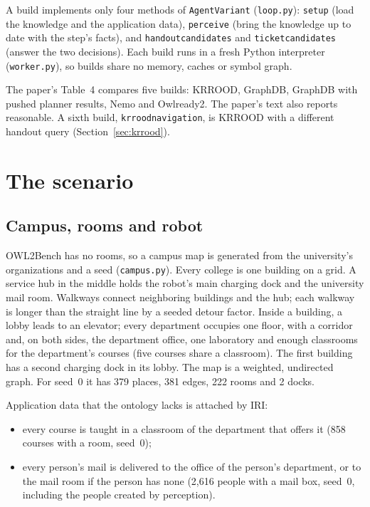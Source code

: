 \documentclass[10pt]{article}
\newcommand{\brkunderscore}{\textunderscore\allowbreak}
\newcommand{\code}[1]{{\let\_\brkunderscore\texttt{#1}}}
\newcommand{\file}[1]{{\let\_\brkunderscore\texttt{#1}}}
\begin{document}
A build implements only four methods of \code{AgentVariant} (\file{loop.py}): \code{setup} (load the knowledge and the
application data), \code{perceive} (bring the knowledge up to date with the step's facts), and
\code{handout\_candidates} and \code{ticket\_candidates} (answer the two decisions). Each build runs in a fresh Python
interpreter (\file{worker.py}), so builds share no memory, caches or symbol graph.

The paper's Table~4 compares five builds: KRROOD, GraphDB, GraphDB with pushed planner results, Nemo and Owlready2.
The paper's text also reports reasonable. A sixth build, \code{krrood\_navigation}, is KRROOD with a different handout query
(Section~\ref{sec:krrood}).

\section{The scenario}
\label{sec:scenario}

\subsection{Campus, rooms and robot}

OWL2Bench has no rooms, so a campus map is generated from the university's organizations and a seed
(\file{campus.py}). Every college is one building on a grid. A service hub in the middle holds the robot's main charging
dock and the university mail room. Walkways connect neighboring buildings and the hub; each walkway is longer than the
straight line by a seeded detour factor. Inside a building, a lobby leads to an elevator; every department occupies one
floor, with a corridor and, on both sides, the department office, one laboratory and enough classrooms for the
department's courses (five courses share a classroom). The first building has a second charging dock in its lobby.
The map is a weighted, undirected graph. For seed~0 it has 379 places, 381 edges, 222 rooms and 2 docks.

Application data that the ontology lacks is attached by IRI:
\begin{itemize}
  \item every course is taught in a classroom of the department that offers it (858 courses with a room, seed~0);
  \item every person's mail is delivered to the office of the person's department, or to the mail room if the person
        has none (2,616 people with a mail box, seed~0, including the people created by perception).
\end{itemize}
\end{document}
